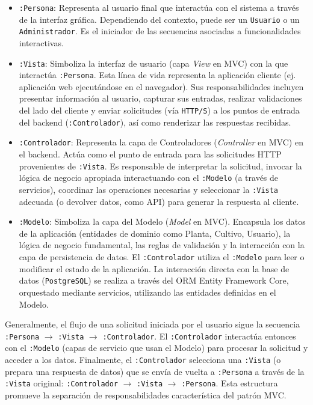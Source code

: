 \begin{itemize}
    \item \texttt{:Persona}: Representa al usuario final que interactúa con el sistema a través de la interfaz gráfica. Dependiendo del contexto, puede ser un \texttt{Usuario} o un \texttt{Administrador}. Es el iniciador de las secuencias asociadas a funcionalidades interactivas.

    \item \texttt{:Vista}: Simboliza la interfaz de usuario (capa \textit{View} en MVC) con la que interactúa \texttt{:Persona}. Esta línea de vida representa la aplicación cliente (ej. aplicación web ejecutándose en el navegador). Sus responsabilidades incluyen presentar información al usuario, capturar sus entradas, realizar validaciones del lado del cliente y enviar solicitudes (vía \texttt{HTTP/S}) a los puntos de entrada del backend (\texttt{:Controlador}), así como renderizar las respuestas recibidas.

    \item \texttt{:Controlador}: Representa la capa de Controladores (\textit{Controller} en MVC) en el backend. Actúa como el punto de entrada para las solicitudes HTTP provenientes de \texttt{:Vista}. Es responsable de interpretar la solicitud, invocar la lógica de negocio apropiada interactuando con el \texttt{:Modelo} (a través de servicios), coordinar las operaciones necesarias y seleccionar la \texttt{:Vista} adecuada (o devolver datos, como API) para generar la respuesta al cliente.

    \item \texttt{:Modelo}: Simboliza la capa del Modelo (\textit{Model} en MVC). Encapsula los datos de la aplicación (entidades de dominio como Planta, Cultivo, Usuario), la lógica de negocio fundamental, las reglas de validación y la interacción con la capa de persistencia de datos. El \texttt{:Controlador} utiliza el \texttt{:Modelo} para leer o modificar el estado de la aplicación. La interacción directa con la base de datos (\texttt{PostgreSQL}) se realiza a través del ORM Entity Framework Core, orquestado mediante servicios, utilizando las entidades definidas en el Modelo.
\end{itemize}

Generalmente, el flujo de una solicitud iniciada por el usuario sigue la secuencia \texttt{:Persona} $\rightarrow$ \texttt{:Vista} $\rightarrow$ \texttt{:Controlador}. El \texttt{:Controlador} interactúa entonces con el \texttt{:Modelo} (capas de servicio que usan el Modelo) para procesar la solicitud y acceder a los datos. Finalmente, el \texttt{:Controlador} selecciona una \texttt{:Vista} (o prepara una respuesta de datos) que se envía de vuelta a \texttt{:Persona} a través de la \texttt{:Vista} original: \texttt{:Controlador} $\rightarrow$ \texttt{:Vista} $\rightarrow$ \texttt{:Persona}. Esta estructura promueve la separación de responsabilidades característica del patrón MVC.

